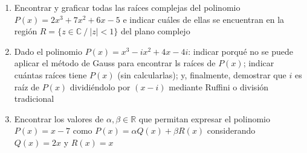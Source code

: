 \documentclass[a4paper]{article}
\begin{document}
\begin{enumerate}
\begin{enumerate} [label=(\alph*)]
		\item Encontrar y graficar todas las raíces complejas del polinomio $P(x)=2x^3+7x^2+6x-5$ e indicar cuáles de ellas se encuentran en la región $R=\{ z \in \mathbb{C} ~/~ |z|<1 \}$ del plano complejo
		\item Dado el polinomio $P(x)=x^3-ix^2+4x-4i$: indicar porqué no se puede aplicar el método de Gauss para encontrar ls raíces de $P(x)$; indicar cuántas raíces tiene $P(x)$ (sin calcularlas); y, finalmente, demostrar que $i$ es raíz de $P(x)$ dividiéndolo por $(x-i)$ mediante Ruffini o división tradicional
		\item Encontrar los valores de $\alpha, \beta \in \mathbb{R}$ que permitan expresar el polinomio $P(x)=x-7$ como $P(x)=\alpha Q(x)+\beta R(x)$ considerando $Q(x)=2x$ y $R(x)=x$
	\end{enumerate}
\end{enumerate}
\vspace{20pt} 
\end{document}
